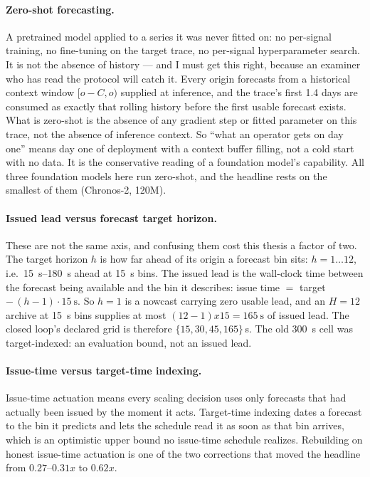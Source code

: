 \documentclass[11pt,a4paper]{article}
\def\times{x}\def\rho{rho}\def\approx{~}\def\leq{<=}\def\geq{>=}%
\def\emph#1{#1}\def\texttt#1{#1}%
\begin{document}
\paragraph{Zero-shot forecasting.} A pretrained model applied to a series it
was never fitted on: no per-signal training, no fine-tuning on the target
trace, no per-signal hyperparameter search. It is \emph{not} the absence of
history --- and I must get this right, because an examiner who has read the
protocol will catch it. Every origin forecasts from a historical context
window $[o{-}C,o)$ supplied at inference, and the trace's first 1.4 days are
consumed as exactly that rolling history before the first usable forecast
exists. What is zero-shot is the absence of any gradient step or fitted
parameter on this trace, not the absence of inference context. So ``what an
operator gets on day one'' means day one of \emph{deployment} with a context
buffer filling, not a cold start with no data. It is the \emph{conservative}
reading of a foundation model's capability. All three foundation models here
run zero-shot, and the headline rests on the smallest of them (Chronos-2,
120M).

\paragraph{Issued lead versus forecast target horizon.} These are not the
same axis, and confusing them cost this thesis a factor of two. The
\emph{target horizon} $h$ is how far ahead of its origin a forecast bin sits:
$h=1\ldots12$, i.e.\ \SIrange{15}{180}{\second} ahead at \SI{15}{\second}
bins. The \emph{issued lead} is the wall-clock time between the forecast
being available and the bin it describes: issue time $=$ target
$-\,(h{-}1)\cdot\SI{15}{\second}$. So $h{=}1$ is a nowcast carrying
\emph{zero} usable lead, and an $H{=}12$ archive at \SI{15}{\second} bins
supplies at most $(12{-}1)\times 15 = \SI{165}{\second}$ of issued lead. The
closed loop's declared grid is therefore $\{15,30,45,165\}$\,\si{\second}.
The old \SI{300}{\second} cell was target-indexed: an evaluation bound, not
an issued lead.

\paragraph{Issue-time versus target-time indexing.} Issue-time actuation
means every scaling decision uses only forecasts that had actually been
issued by the moment it acts. Target-time indexing dates a forecast to the
bin it predicts and lets the schedule read it as soon as that bin arrives,
which is an optimistic upper bound no issue-time schedule realizes. Rebuilding
on honest issue-time actuation is one of the two corrections that moved the
headline from $0.27$--$0.31\times$ to $0.62\times$.
\end{document}
